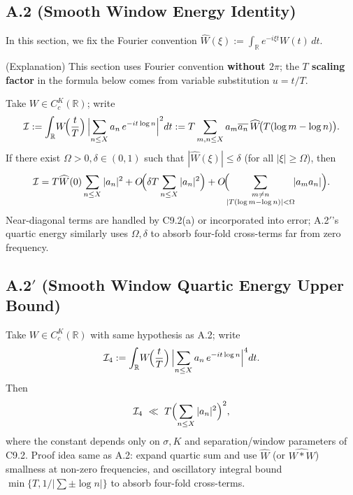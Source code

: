 \documentclass[11pt,a4paper]{article}
\theoremstyle{remark}
\begin{document}
\subsection{A.2 (Smooth Window Energy Identity)}

In this section, we fix the Fourier convention $\widehat{W}(\xi):=\int_{\mathbb{R}}e^{-i\xi t}W(t)\,dt$.

(Explanation) This section uses Fourier convention \textbf{without $2\pi$}; the \textbf{$T$ scaling factor} in the formula below comes from variable substitution $u=t/T$.

Take $W\in C_c^K(\mathbb{R})$; write
\begin{equation}
\mathcal{I}:=\int_{\mathbb{R}}\!W\!\Bigl(\frac{t}{T}\Bigr)\,\Bigl|\sum_{n\le X}a_n\,e^{-it\log n}\Bigr|^2 dt
:=T\sum_{m,n\le X}a_m\overline{a_n}\,\widehat{W}\!\bigl(T(\log m-\log n)\bigr).
\end{equation}
If there exist $\Omega>0,\delta\in(0,1)$ such that $|\widehat{W}(\xi)|\le\delta$ (for all $|\xi|\ge\Omega$), then
\begin{equation}
\mathcal{I}
=T\widehat{W}(0)\sum_{n\le X}|a_n|^2
+O\!\Bigl(\delta T\sum_{n\le X}|a_n|^2\Bigr)
+O\!\Bigl(\!\!\sum_{\substack{m\ne n\\ |T(\log m-\log n)|<\Omega}}\!\!|a_m a_n|\Bigr).
\end{equation}
Near-diagonal terms are handled by C9.2(a) or incorporated into error; A.2$'$'s quartic energy similarly uses $\Omega,\delta$ to absorb four-fold cross-terms far from zero frequency.

\subsection{A.2$'$ (Smooth Window Quartic Energy Upper Bound)}

Take $W\in C_c^K(\mathbb{R})$ with same hypothesis as A.2; write
\begin{equation}
\mathcal{I}_4:=\int_{\mathbb{R}}\!W\!\Bigl(\frac{t}{T}\Bigr)\,\Bigl|\sum_{n\le X}a_n\,e^{-it\log n}\Bigr|^4 dt.
\end{equation}
Then
\begin{equation}
\mathcal{I}_4\ \ll\ T\Bigl(\sum_{n\le X}|a_n|^2\Bigr)^{2},
\end{equation}
where the constant depends only on $\sigma,K$ and separation/window parameters of C9.2. Proof idea same as A.2: expand quartic sum and use $\widehat{W}$ (or $\widehat{W\!*\!W}$) smallness at non-zero frequencies, and oscillatory integral bound $\min\{T,1/|\sum\pm\log n|\}$ to absorb four-fold cross-terms.
\end{document}
